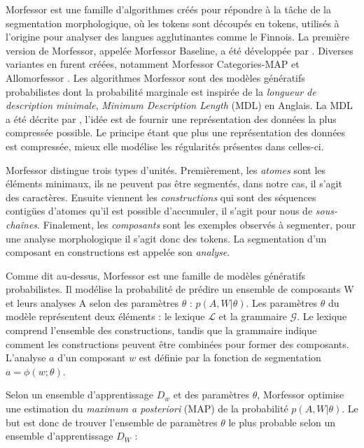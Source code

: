 \documentclass[PhD-Yoann-Dupont.tex]{subfiles}
\begin{document}
Morfessor \citep{creutz2005unsupervised,virpioja2013morfessor} est une famille d'algorithmes créés pour répondre à la tâche de la segmentation morphologique, où les tokens sont découpés en tokens, utilisés à l'origine pour analyser des langues agglutinantes comme le Finnois. La première version de Morfessor, appelée Morfessor Baseline, a été développée par \citet{creutz2002unsupervised}. Diverses variantes en furent créées, notamment Morfessor Categories-MAP \citep{creutz2005inducing} et Allomorfessor \citep{virpioja2009unsupervised}. Les algorithmes Morfessor sont des modèles génératifs probabilistes dont la probabilité marginale est inspirée de la \emph{longueur de description minimale}, \emph{Minimum Description Length} (MDL) en Anglais. La MDL a été décrite par \citet{rissanen1978modeling}, l'idée est de fournir une représentation des données la plus compressée possible. Le principe étant que plus une représentation des données est compressée, mieux elle modélise les régularités présentes dans celles-ci.

Morfessor distingue trois types d'unités. Premièrement, les \emph{atomes} sont les éléments minimaux, ils ne peuvent pas être segmentés, dans notre cas, il s'agit des caractères. Ensuite viennent les \emph{constructions} qui sont des séquences contigües d'atomes qu'il est possible d'accumuler, il s'agit pour nous de \emph{sous-chaînes}. Finalement, les \emph{composants} sont les exemples observés à segmenter, pour une analyse morphologique il s'agit donc des tokens. La segmentation d'un composant en constructions est appelée son \emph{analyse}.

Comme dit au-dessus, Morfessor est une famille de modèles génératifs probabilistes. Il modélise la probabilité de prédire un ensemble de composants W et leurs analyses A selon des paramètres $\theta$ : $p(A, W | \theta)$. Les paramètres $\theta$ du modèle représentent deux éléments : le lexique $\mathcal{L}$ et la grammaire $\mathcal{G}$. Le lexique comprend l'ensemble des constructions, tandis que la grammaire indique comment les constructions peuvent être combinées pour former des composants. L'analyse $a$ d'un composant $w$ est définie par la fonction de segmentation $a = \phi(w;\theta)$.

Selon un ensemble d'apprentissage $D_{w}$ et des paramètres $\theta$, Morfessor optimise une estimation du \emph{maximum a posteriori} (MAP) de la probabilité $p(A, W | \theta)$. Le but est donc de trouver l'ensemble de paramètres $\theta$ le plus probable selon un ensemble d'apprentissage $D_{W}$ :
\end{document}
